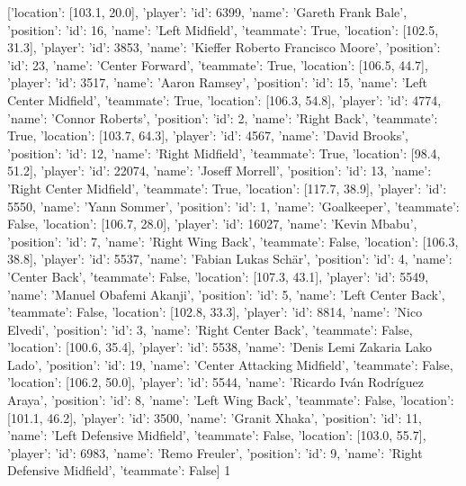 [{'location': [103.1, 20.0], 'player': {'id': 6399, 'name': 'Gareth Frank Bale'}, 'position': {'id': 16, 'name': 'Left Midfield'}, 'teammate': True}, {'location': [102.5, 31.3], 'player': {'id': 3853, 'name': 'Kieffer Roberto Francisco Moore'}, 'position': {'id': 23, 'name': 'Center Forward'}, 'teammate': True}, {'location': [106.5, 44.7], 'player': {'id': 3517, 'name': 'Aaron Ramsey'}, 'position': {'id': 15, 'name': 'Left Center Midfield'}, 'teammate': True}, {'location': [106.3, 54.8], 'player': {'id': 4774, 'name': 'Connor Roberts'}, 'position': {'id': 2, 'name': 'Right Back'}, 'teammate': True}, {'location': [103.7, 64.3], 'player': {'id': 4567, 'name': 'David Brooks'}, 'position': {'id': 12, 'name': 'Right Midfield'}, 'teammate': True}, {'location': [98.4, 51.2], 'player': {'id': 22074, 'name': 'Joseff Morrell'}, 'position': {'id': 13, 'name': 'Right Center Midfield'}, 'teammate': True}, {'location': [117.7, 38.9], 'player': {'id': 5550, 'name': 'Yann Sommer'}, 'position': {'id': 1, 'name': 'Goalkeeper'}, 'teammate': False}, {'location': [106.7, 28.0], 'player': {'id': 16027, 'name': 'Kevin Mbabu'}, 'position': {'id': 7, 'name': 'Right Wing Back'}, 'teammate': False}, {'location': [106.3, 38.8], 'player': {'id': 5537, 'name': 'Fabian Lukas Schär'}, 'position': {'id': 4, 'name': 'Center Back'}, 'teammate': False}, {'location': [107.3, 43.1], 'player': {'id': 5549, 'name': 'Manuel Obafemi Akanji'}, 'position': {'id': 5, 'name': 'Left Center Back'}, 'teammate': False}, {'location': [102.8, 33.3], 'player': {'id': 8814, 'name': 'Nico Elvedi'}, 'position': {'id': 3, 'name': 'Right Center Back'}, 'teammate': False}, {'location': [100.6, 35.4], 'player': {'id': 5538, 'name': 'Denis Lemi Zakaria Lako Lado'}, 'position': {'id': 19, 'name': 'Center Attacking Midfield'}, 'teammate': False}, {'location': [106.2, 50.0], 'player': {'id': 5544, 'name': 'Ricardo Iván Rodríguez Araya'}, 'position': {'id': 8, 'name': 'Left Wing Back'}, 'teammate': False}, {'location': [101.1, 46.2], 'player': {'id': 3500, 'name': 'Granit Xhaka'}, 'position': {'id': 11, 'name': 'Left Defensive Midfield'}, 'teammate': False}, {'location': [103.0, 55.7], 'player': {'id': 6983, 'name': 'Remo Freuler'}, 'position': {'id': 9, 'name': 'Right Defensive Midfield'}, 'teammate': False}]                                                                                                                                                                                                                                                                                                                                                                                                                                                                                                                                                                                                                                                      1
